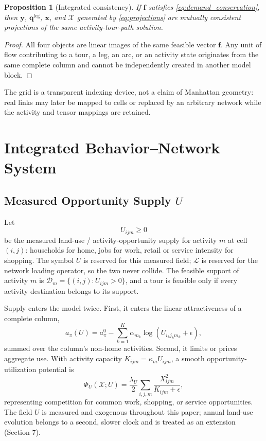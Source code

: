\documentclass[10pt]{article}
\newtheorem{proposition}{Proposition}
\newcommand{\vect}[1]{\boldsymbol{#1}}
\newcommand{\Load}{\mathcal{L}}
\begin{document}
\begin{proposition}[Integrated consistency]
If $\vect f$ satisfies \eqref{eq:demand_conservation}, then $\vect y$, $\vect q^{\mathrm{leg}}$, $\vect x$, and $\mathcal X$ generated by \eqref{eq:projections} are mutually consistent projections of the same activity-tour-path solution.
\end{proposition}

\begin{proof}
All four objects are linear images of the same feasible vector $\vect f$. Any unit of flow contributing to a tour, a leg, an arc, or an activity state originates from the same complete column and cannot be independently created in another model block.
\end{proof}

The grid is a transparent indexing device, not a claim of Manhattan geometry: real links may later be mapped to cells or replaced by an arbitrary network while the activity and tensor mappings are retained.

\section{Integrated Behavior--Network System}

\subsection{Measured Opportunity Supply $U$}
Let
\begin{equation}
U_{ijm}\geq 0
\label{eq:opportunity}
\end{equation}
be the measured land-use / activity-opportunity supply for activity $m$ at cell $(i,j)$: households for home, jobs for work, retail or service intensity for shopping. The symbol $U$ is reserved for this measured field; $\Load$ is reserved for the network loading operator, so the two never collide. The feasible support of activity $m$ is $\mathcal D_m=\{(i,j):U_{ijm}>0\}$, and a tour is feasible only if every activity destination belongs to its support.

Supply enters the model twice. First, it enters the linear attractiveness of a complete column,
\begin{equation}
a_{\pi}(U)=a^{0}_{\pi}
-\sum_{k=1}^{K}\alpha_{m_k}
\log\!\left(U_{i_kj_km_k}+\epsilon\right),
\label{eq:attractiveness}
\end{equation}
summed over the column's non-home activities. Second, it limits or prices aggregate use. With activity capacity $K_{ijm}=\kappa_m U_{ijm}$, a smooth opportunity-utilization potential is
\begin{equation}
\Phi_U(\mathcal X;U)=
\frac{\lambda_U}{2}\sum_{i,j,m}
\frac{X_{ijm}^2}{K_{ijm}+\epsilon},
\label{eq:opportunity_potential}
\end{equation}
representing competition for common work, shopping, or service opportunities. The field $U$ is measured and exogenous throughout this paper; annual land-use evolution belongs to a second, slower clock and is treated as an extension (Section 7).
\end{document}
